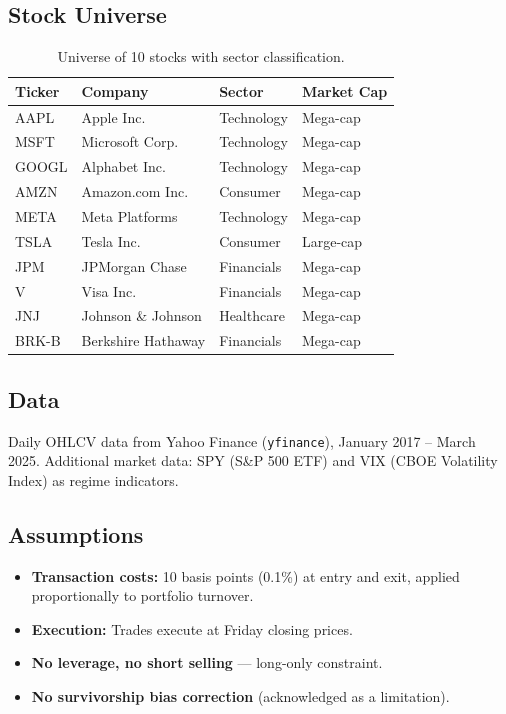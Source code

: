 \documentclass[12pt,a4paper]{article}
\begin{document}
\subsection{Stock Universe}
\begin{table}[H]
\centering
\caption{Universe of 10 stocks with sector classification.}
\begin{tabular}{llll}
\toprule
\textbf{Ticker} & \textbf{Company} & \textbf{Sector} & \textbf{Market Cap} \\
\midrule
AAPL  & Apple Inc.           & Technology  & Mega-cap \\
MSFT  & Microsoft Corp.      & Technology  & Mega-cap \\
GOOGL & Alphabet Inc.        & Technology  & Mega-cap \\
AMZN  & Amazon.com Inc.      & Consumer    & Mega-cap \\
META  & Meta Platforms       & Technology  & Mega-cap \\
TSLA  & Tesla Inc.           & Consumer    & Large-cap \\
JPM   & JPMorgan Chase       & Financials  & Mega-cap \\
V     & Visa Inc.            & Financials  & Mega-cap \\
JNJ   & Johnson \& Johnson   & Healthcare  & Mega-cap \\
BRK-B & Berkshire Hathaway   & Financials  & Mega-cap \\
\bottomrule
\end{tabular}
\end{table}

\subsection{Data}
Daily OHLCV data from Yahoo Finance (\texttt{yfinance}), January 2017 -- March 2025. Additional market data: SPY (S\&P 500 ETF) and VIX (CBOE Volatility Index) as regime indicators.

\subsection{Assumptions}
\begin{itemize}
    \item \textbf{Transaction costs:} 10 basis points (0.1\%) at entry and exit, applied proportionally to portfolio turnover.
    \item \textbf{Execution:} Trades execute at Friday closing prices.
    \item \textbf{No leverage, no short selling} --- long-only constraint.
    \item \textbf{No survivorship bias correction} (acknowledged as a limitation).
\end{itemize}
\end{document}
